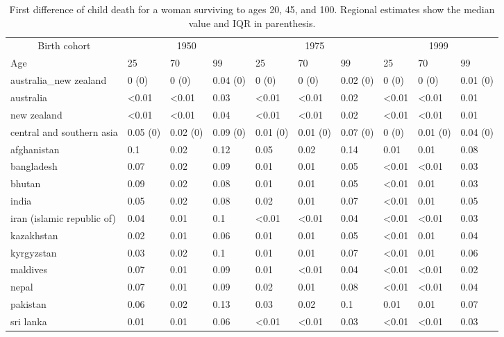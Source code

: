 \begin{table}[!h]

\caption{\label{tab:S7}First difference of child death for a woman surviving to ages 20, 45, and 100. Regional estimates show the median value and IQR in parenthesis.}
\centering
\begin{tabular}[t]{llllllllll}
\toprule
\multicolumn{1}{c}{Birth cohort} & \multicolumn{3}{c}{1950} & \multicolumn{3}{c}{1975} & \multicolumn{3}{c}{1999} \\
\cmidrule(l{3pt}r{3pt}){1-1} \cmidrule(l{3pt}r{3pt}){2-4} \cmidrule(l{3pt}r{3pt}){5-7} \cmidrule(l{3pt}r{3pt}){8-10}
Age & 25 & 70 & 99 & 25 & 70 & 99 & 25 & 70 & 99\\
\midrule
australia\_new zealand & 0 (0) & 0 (0) & 0.04 (0) & 0 (0) & 0 (0) & 0.02 (0) & 0 (0) & 0 (0) & 0.01 (0)\\
australia & <0.01 & <0.01 & 0.03 & <0.01 & <0.01 & 0.02 & <0.01 & <0.01 & 0.01\\
new zealand & <0.01 & <0.01 & 0.04 & <0.01 & <0.01 & 0.02 & <0.01 & <0.01 & 0.01\\
central and southern asia & 0.05 (0) & 0.02 (0) & 0.09 (0) & 0.01 (0) & 0.01 (0) & 0.07 (0) & 0 (0) & 0.01 (0) & 0.04 (0)\\
afghanistan & 0.1 & 0.02 & 0.12 & 0.05 & 0.02 & 0.14 & 0.01 & 0.01 & 0.08\\
\addlinespace
bangladesh & 0.07 & 0.02 & 0.09 & 0.01 & 0.01 & 0.05 & <0.01 & <0.01 & 0.03\\
bhutan & 0.09 & 0.02 & 0.08 & 0.01 & 0.01 & 0.05 & <0.01 & 0.01 & 0.03\\
india & 0.05 & 0.02 & 0.08 & 0.02 & 0.01 & 0.07 & <0.01 & 0.01 & 0.05\\
iran (islamic republic of) & 0.04 & 0.01 & 0.1 & <0.01 & <0.01 & 0.04 & <0.01 & <0.01 & 0.03\\
kazakhstan & 0.02 & 0.01 & 0.06 & 0.01 & 0.01 & 0.05 & <0.01 & 0.01 & 0.04\\
\addlinespace
kyrgyzstan & 0.03 & 0.02 & 0.1 & 0.01 & 0.01 & 0.07 & <0.01 & 0.01 & 0.06\\
maldives & 0.07 & 0.01 & 0.09 & 0.01 & <0.01 & 0.04 & <0.01 & <0.01 & 0.02\\
nepal & 0.07 & 0.01 & 0.09 & 0.02 & 0.01 & 0.08 & <0.01 & <0.01 & 0.04\\
pakistan & 0.06 & 0.02 & 0.13 & 0.03 & 0.02 & 0.1 & 0.01 & 0.01 & 0.07\\
sri lanka & 0.01 & 0.01 & 0.06 & <0.01 & <0.01 & 0.03 & <0.01 & <0.01 & 0.03\\

\end{tabular}
\end{table}
